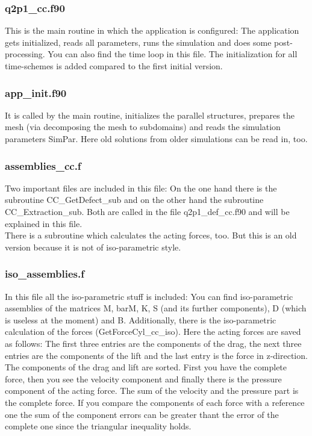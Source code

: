 \subsubsection*{q2p1\_cc.f90} 
This is the main routine in which the application is configured: The application gets initialized, reads all parameters, runs the simulation and does some post-processing. You can also find the time loop in this file. The initialization for all time-schemes is added compared to the first initial version.

\subsubsection*{app\_init.f90} 
It is called by the main routine, initializes the parallel structures, prepares the mesh (via decomposing the mesh to subdomains) and reads the simulation parameters SimPar. Here old solutions from older simulations can be read in, too.

\subsubsection*{assemblies\_cc.f}
Two important files are included in this file: On the one hand there is the subroutine CC\_GetDefect\_sub and on the other hand the subroutine CC\_Extraction\_sub. Both are called in the file q2p1\_def\_cc.f90 and will be explained in this file.\\
There is a subroutine which calculates the acting forces, too. But this is an old version because it is not of iso-parametric style.

\subsubsection*{iso\_assemblies.f} 
In this file all the iso-parametric stuff is included: You can find iso-parametric assemblies of the matrices M, barM, K, S (and its further components), D (which is useless at the moment) and B. Additionally, there is the iso-parametric calculation of the forces (GetForceCyl\_cc\_iso). Here the acting forces are saved as follows: The first three entries are the components of the drag, the next three entries are the components of the lift and the last entry is the force in z-direction. The components of the drag and lift are sorted. First you have the complete force, then you see the velocity component and finally there is the pressure component of the acting force. The sum of the velocity and the pressure part is the complete force. If you compare the components of each force with a reference one the sum of the component errors can be greater thant the error of the complete one since the triangular inequality holds.

